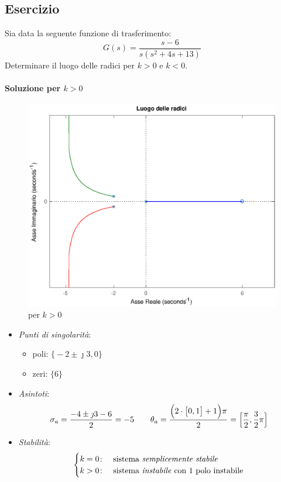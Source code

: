 \subsection{Esercizio}
Sia data la seguente funzione di trasferimento:
\[
	G(s) = \frac{s-6}{s(s^2+4s+13)}
\]
Determinare il luogo delle radici per \(k>0\) e \(k<0\).

\paragraph{Soluzione per \(k>0\)}

\begin{figure}[ht]
	\centering
	\includegraphics[scale=.5]{mod1/assets/rl_ex313}
	\caption{per \(k>0\)}
\end{figure}

\begin{itemize}
	\item \emph{Punti di singolarità}:
		\begin{itemize}
			\item poli: \(\bigl\{-2\pm\jmath3,0\bigr\}\)
			\item zeri: \(\bigl\{6\bigr\}\)
		\end{itemize}
	\item \emph{Asintoti}:
		\[
			\sigma_a = \frac{-4\pm\jmath3-6}{2} = -5 \qquad
			\theta_a = \frac{\Bigl(2\cdot\bigl[0,1\bigr]+1\Bigr)\pi}{2} = \Bigl[\frac{\pi}{2},\frac{3}{2}\pi\Bigr]
		\]
	\item \emph{Stabilità}:
		\[\begin{cases}
			k=0\colon & \text{sistema \emph{semplicemente stabile}} \\
			k>0\colon & \text{sistema \emph{instabile} con 1 polo instabile}
		\end{cases}\]
\end{itemize}

